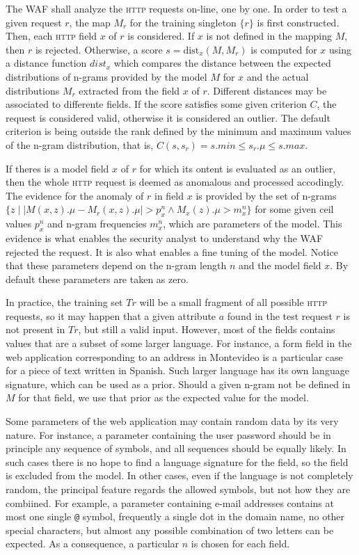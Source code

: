 \documentclass[runningheads,a4paper]{llncs}
\newcommand{\HTTP}{\textsc{http}\xspace}
\newcommand{\dist}{\text{dist}}
\begin{document}
The WAF shall analyze the \HTTP requests on-line, one by one. In order to test a given request $r$, the map $M_r$ for the training singleton $\{r\}$ is first constructed. Then, each \HTTP field $x$ of $r$ is considered. If $x$ is not defined in the mapping $M$, then $r$ is rejected. Otherwise, a score $s=\dist_x(M,M_r)$ is computed for $x$ using a distance function $\textit{dist}_x$ which compares the distance between the expected distributions of n-grams provided by the model $M$ for $x$ and the actual distributions $M_r$ extracted from the field $x$ of $r$. Different distances may be associated to differente fields. If the score satisfies some given criterion $C$, the request is considered valid, otherwise it is considered an outlier. The default criterion is being outside the rank defined by the minimum and maximum values of the n-gram distribution, that is,  $C(s,s_r) = s.min \leq s_r.\mu \leq s.max$.

If theres is a model field $x$ of $r$ for which its ontent is evaluated as an outlier, then the whole \HTTP request is deemed as anomalous and processed accodingly. The evidence for the anomaly of $r$ in field $x$ is provided by the set of n-grams $\{ z  \mid  \lvert M(x,z).\mu - M_{r}(x,z).\mu \rvert > p^n_x \land M_x(z).\mu > m^n_x\}$ for some given ceil values $p^n_x$ and n-gram frequencies $m^n_x$, which are parameters of the model. This evidence is what enables the security analyst to understand why the WAF rejected the request. It is also what enables a fine tuning of the model. Notice that these parameters depend on the n-gram length $n$ and the model field $x$. By default these parameters are taken as zero. 

In practice, the training set $Tr$ will be a small fragment of all possible \HTTP requests, so it may happen that a given attribute $a$ found in the test request $r$ is not present in $Tr$, but still a valid input. However, most of the fields contains values that are a subset of some larger language. For instance, a form field in the web application corresponding to an address in Montevideo is a particular case for a piece of text written in Spanish. Such larger language has its own language signature, which can be used as a prior. Should a given n-gram not be defined in $M$ for that field, we use that prior as the expected value for the model. 

Some parameters of the web application may contain random data by its very nature. For instance, a parameter containing the user password should be in principle any sequence of symbols, and all sequences should be equally likely. In such cases there is no hope to find a language signature for the field, so the field is excluded from the model. In other cases, even if the language is not completely random, the principal feature regards the allowed symbols, but not how they are combiined. For example, a parameter containing e-mail addresses contains at most one single \texttt{@} symbol, frequently a single dot in the domain name, no other special characters, but almost any possible combination of two letters can be expected. As a consequence, a particular $n$ is chosen for each field. 
\end{document}
